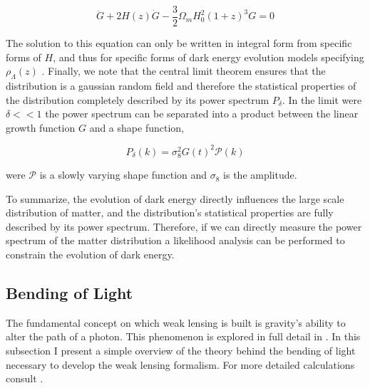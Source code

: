 \begin{equation}
  \ddot{G} + 2H(z)\dot{G} - \frac{3}{2} \Omega_m H_0^2(1+z)^3G = 0
  \label{eq:growth}
\end{equation}

The solution to this equation can only be written in integral form from specific forms of $H$, and thus for specific forms of dark energy evolution models specifying $\rho_\Lambda(z)$ \cite{general_2013,ryden}. Finally, we note that the central limit theorem ensures that the distribution is a gaussian random field and therefore the statistical properties of the distribution completely described by its power spectrum $P_\delta$. In the limit were $\delta << 1$ the power spectrum can be separated into a product between the linear growth function $G$ and a shape function,

\begin{equation}
  P_\delta(k) = \sigma_8^2 G(t)^2 \mathcal{P}(k)
  \label{eq:powerspecd}
\end{equation}

were $\mathcal{P}$ is a slowly varying shape function and $\sigma_8$ is the amplitude. 

\par To summarize, the evolution of dark energy directly influences the large scale distribution of matter, and the distribution's statistical properties are fully described by its power spectrum. Therefore, if we can directly measure the power spectrum of the matter distribution a likelihood analysis can be performed to constrain the evolution of dark energy.
 



\subsection{Bending of Light}
The fundamental concept on which weak lensing is built is gravity's ability to alter the path of a photon. This phenomenon is explored in full detail in \cite{GR1,basicLens,Mellier:1998pk}.
In this subsection I present a simple overview of the theory behind the bending of light necessary to develop the weak lensing formalism. For more detailed calculations consult \cite{GR1,basicLens,Mellier:1998pk}.
